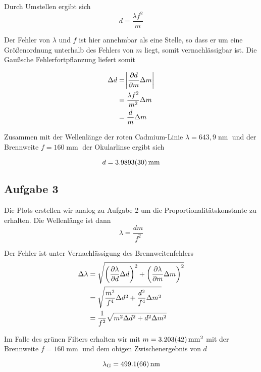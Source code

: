 \documentclass[a4paper,german,12pt,smallheadings]{scrartcl}
\begin{document}
Durch Umstellen ergibt sich
\begin{equation}
  d = \frac{\lambda f^2}{m}
\end{equation}

Der Fehler von $\lambda$ und $f$ ist hier annehmbar als eine Stelle, so dass er
um eine Größenordnung unterhalb des Fehlers von $m$ liegt, somit
vernachlässigbar ist. Die Gaußsche Fehlerfortpflanzung liefert somit

\begin{align*}
  \Delta d &= \envert{\frac{\partial d}{\partial m} \Delta m} \\
           &= \frac{\lambda f^2}{m^2} \Delta m \\
           &= \frac{d}{m} \Delta m
\end{align*}

Zusammen mit der Wellenlänge der roten Cadmium-Linie $\lambda = 643{,}9
\operatorname{nm}$ und der Brennweite $f = 160 \operatorname{mm}$ der
Okularlinse ergibt sich

\begin{equation}
  d = \num{3.9893+-0.0030} \operatorname{mm}
\end{equation}

\subsection{Aufgabe 3}

Die Plots erstellen wir analog zu Aufgabe 2 um die Proportionalitätskonstante
zu erhalten. Die Wellenlänge ist dann
\begin{equation}
  \lambda = \frac{dm}{f^2}
\end{equation}

Der Fehler ist unter Vernachlässigung des Brennweitenfehlers
\begin{align*}
  \Delta \lambda &= \sqrt{
    \del{\frac{\partial \lambda}{\partial d} \Delta d}^2 +
    \del{\frac{\partial \lambda}{\partial m} \Delta m}^2
  } \\
  &= \sqrt{
    \frac{m^2}{f^4} \Delta d^2 +
    \frac{d^2}{f^4} \Delta m^2
  } \\
  &= \frac{1}{f^2} \sqrt{
    m^2 \Delta d^2 +
    d^2 \Delta m^2
  }
\end{align*}


Im Falle des grünen Filters erhalten wir mit $m = \num{3.203+-0.042}
\operatorname{mm}^2$ mit der Brennweite $f = 160 \operatorname{mm}$ und
dem obigen Zwischenergebnis von $d$

\begin{equation}
  \lambda_\text{G} = \num{499.1+-6.6} \operatorname{nm}
\end{equation}
\end{document}
